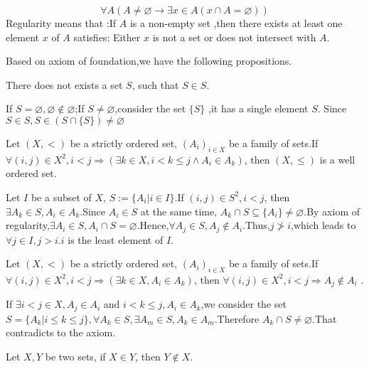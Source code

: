 \documentclass{book}
\numberwithin{equation}{section}
\begin{document}
\begin{axiomenv}
    $$\forall A(A\not=\varnothing\rightarrow\exists x\in A(x\cap A=\varnothing))$$
    Regularity means that :If $A$ is a non-empty set ,then there exists at least one element $x$ of $A$ satisfies: Either $x$ is not a set or does not intersect with $A$.
\end{axiomenv}
Based on axiom of foundation,we have the following propositions.
\begin{propositionenv}
    
    There does not exists a set $S$, such that $S\in S$.
\end{propositionenv}
\begin{proofenv}
    If $S=\varnothing,\varnothing\notin\varnothing$;If $S\not=\varnothing$,consider the set $\{S\}$ ,it has a single element $S$. Since $S\in S,S\in (S\cap\{S\})\not=\varnothing$
\end{proofenv}
\begin{propositionenv}

    Let $(X,<)$ be a strictly ordered set, $(A_i)_{i\in X}$ be a family of sets.If $\forall (i,j)\in X^2,i<j\Rightarrow(\exists k\in X,i<k\le j\wedge A_i\in A_k)$, then $(X,\le)$ is a well ordered set.
\end{propositionenv}
\begin{proofenv}
    
    Let $I$ be a subset of $X$, $S:=\{A_i|i\in I\}$.If $(i,j)\in S^2,i<j$, then $\exists A_k\in S,A_i\in A_k$.Since $A_i\in S$ at the same time, $A_k\cap S\subseteq\{A_i\}\not=\varnothing$.By axiom of regularity,$\exists A_i\in S,A_i\cap S=\varnothing$.Hence,$\forall A_j\in S,A_j\notin A_i$.Thus,$j\not>i$,which leads to $\forall j\in I, j>i$.$i$ is the least element of $I$.
\end{proofenv}
\begin{propositionenv}
   Let $(X,<)$ be a strictly ordered set, $(A_i)_{i\in X}$ be a family of sets.If $\forall (i,j)\in X^2,i<j\Rightarrow(\exists k\in X, A_i\in A_k)$, then $\forall (i,j)\in X^2,i<j\Rightarrow A_j\notin A_i$ .
\end{propositionenv}
\begin{proofenv}
    If $\exists i<j\in X,A_j\in A_i$ and $i<k\le j,A_i\in A_k$,we consider the set $S=\{A_k|i\le k\le j\},\forall A_k\in S,\exists A_m\in S,A_k\in A_m$.Therefore $A_k\cap S\not=\varnothing$.That contradicts to the axiom.
\end{proofenv}
\begin{corollaryenv}
    Let $X,Y$ be two sets, if $X\in Y$, then $Y\notin X$.
\end{corollaryenv}
\end{document}
